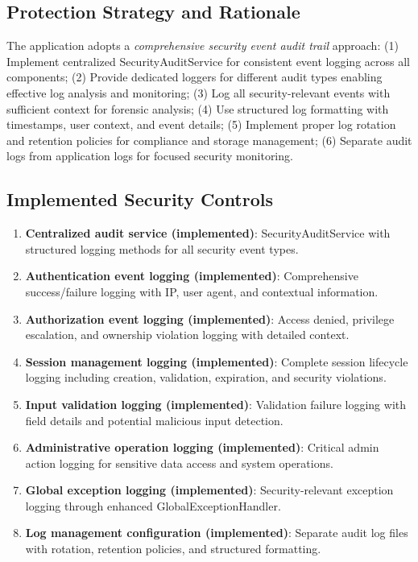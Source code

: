 \documentclass[]{UCD_CS_FYP_Report}
\begin{document}
\subsection{Protection Strategy and Rationale}
The application adopts a \textit{comprehensive security event audit trail} approach: (1) Implement centralized SecurityAuditService for consistent event logging across all components; (2) Provide dedicated loggers for different audit types enabling effective log analysis and monitoring; (3) Log all security-relevant events with sufficient context for forensic analysis; (4) Use structured log formatting with timestamps, user context, and event details; (5) Implement proper log rotation and retention policies for compliance and storage management; (6) Separate audit logs from application logs for focused security monitoring.

\subsection{Implemented Security Controls}
\begin{enumerate}
	\item \textbf{Centralized audit service (implemented)}: SecurityAuditService with structured logging methods for all security event types.
	\item \textbf{Authentication event logging (implemented)}: Comprehensive success/failure logging with IP, user agent, and contextual information.
	\item \textbf{Authorization event logging (implemented)}: Access denied, privilege escalation, and ownership violation logging with detailed context.
	\item \textbf{Session management logging (implemented)}: Complete session lifecycle logging including creation, validation, expiration, and security violations.
	\item \textbf{Input validation logging (implemented)}: Validation failure logging with field details and potential malicious input detection.
	\item \textbf{Administrative operation logging (implemented)}: Critical admin action logging for sensitive data access and system operations.
	\item \textbf{Global exception logging (implemented)}: Security-relevant exception logging through enhanced GlobalExceptionHandler.
	\item \textbf{Log management configuration (implemented)}: Separate audit log files with rotation, retention policies, and structured formatting.
\end{enumerate}
\end{document}
